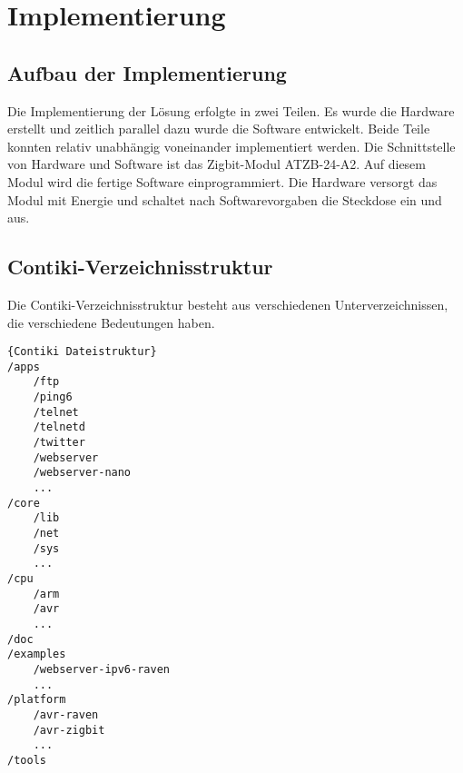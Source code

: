 
\chapter{Implementierung} \label{Implementierung}

\section{Aufbau der Implementierung}

Die Implementierung der Lösung erfolgte in zwei Teilen. Es wurde die Hardware erstellt und zeitlich parallel dazu wurde die Software entwickelt. Beide Teile konnten relativ unabhängig voneinander implementiert werden. Die Schnittstelle von Hardware und Software ist das Zigbit-Modul ATZB-24-A2. Auf diesem Modul wird die fertige Software einprogrammiert. Die Hardware versorgt das Modul mit Energie und schaltet nach Softwarevorgaben die Steckdose ein und aus.



\section{Contiki-Verzeichnisstruktur}

Die Contiki-Verzeichnisstruktur besteht aus verschiedenen Unterverzeichnissen, die verschiedene Bedeutungen haben.

\begin{lstlisting}[caption=Contiki-Verzeichnisstruktur mit ausgewählten Unterverzeichnissen]{Contiki Dateistruktur}
/apps                                     
    /ftp                                      
    /ping6                                
    /telnet                               
    /telnetd                              
    /twitter                              
    /webserver                            
    /webserver-nano                       
    ...                                   
/core                                    
    /lib                                  
    /net                                  
    /sys                                  
    ...
/cpu
    /arm
    /avr
    ...
/doc
/examples
    /webserver-ipv6-raven
    ...
/platform
    /avr-raven
    /avr-zigbit
    ...
/tools
\end{lstlisting}

